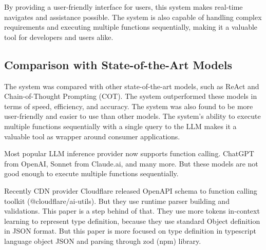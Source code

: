 \documentclass[conference]{IEEEtran}
\begin{document}
By providing a user-friendly interface for users, this system makes real-time navigates and assistance possible. The system is also capable of handling complex requirements and executing multiple functions sequentially, making it a valuable tool for developers and users alike.

\subsection{Comparison with State-of-the-Art Models}
The system was compared with other state-of-the-art models, such as ReAct and Chain-of-Thought Prompting (COT). The system outperformed these models in terms of speed, efficiency, and accuracy. The system was also found to be more user-friendly and easier to use than other models. The system's ability to execute multiple functions sequentially with a single query to the LLM makes it a valuable tool as wrapper around consumer applications.

Most popular LLM inference provider now supports function calling. ChatGPT from OpenAI, Sonnet from Claude.ai, and many more. But these models are not good enough to execute multiple functions sequentially. 

Recently CDN provider Cloudflare released OpenAPI schema to function calling toolkit (@cloudflare/ai-utils). But they use runtime parser building and validations. This paper is a step behind of that. They use more tokens in-context learning to represent type definition, because they use standard Object definition in JSON format. But this paper is more focused on type definition in typescript language object JSON and parsing through zod (npm) library.



\end{document}
